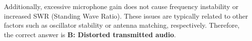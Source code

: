 Additionally, excessive microphone gain does not cause frequency instability or increased SWR (Standing Wave Ratio). These issues are typically related to other factors such as oscillator stability or antenna matching, respectively. Therefore, the correct answer is \textbf{B: Distorted transmitted audio}.

